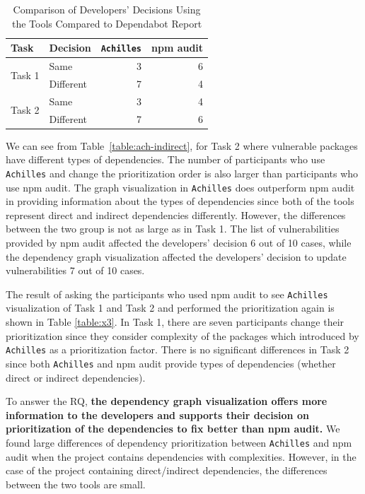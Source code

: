 \documentclass[conference]{IEEEtran}
\begin{document}
	
	\begin{table}[tb]
		\centering
		\caption{Comparison of Developers' Decisions Using the Tools Compared to Dependabot Report}
		\begin{tabular}{llrr}
			\toprule
			Task & Decision & \texttt{Achilles} & npm audit \\
			\midrule
			\multirow{2}{*}{Task 1} & Same & 3 & 6 \\ 
			& Different & 7 & 4 \\ \midrule
			\multirow{2}{*}{Task 2} & Same & 3 & 4 \\ 
			& Different & 7 & 6 \\
			\bottomrule
		\end{tabular}
		\label{table:compare-ach}
	\end{table}
	
	We can see from Table~\ref{table:ach-indirect}, for Task 2 where vulnerable packages have different types of dependencies. The number of participants who use \texttt{Achilles} and change the prioritization order is also larger than participants who use npm audit. The graph visualization in \texttt{Achilles} does outperform npm audit in providing information about the types of dependencies since both of the tools represent direct and indirect dependencies differently. However, the differences between the two group is not as large as in Task 1. The list of vulnerabilities provided by npm audit affected the developers' decision 6 out of 10 cases, while the dependency graph visualization affected the developers' decision to update vulnerabilities 7 out of 10 cases.
	
	The result of asking the participants who used npm audit to see \texttt{Achilles} visualization of Task 1 and Task 2 and performed the prioritization again is shown in Table \ref{table:x3}. In Task 1, there are seven participants change their prioritization since they consider complexity of the packages which introduced by \texttt{Achilles} as a prioritization factor. There is no significant differences in Task 2 since both \texttt{Achilles} and npm audit provide types of dependencies (whether direct or indirect dependencies).
	
	To answer the RQ, \textbf{the dependency graph visualization offers more information to the developers and supports their decision on prioritization of the dependencies to fix better than npm audit.} We found large differences of dependency prioritization between \texttt{Achilles} and npm audit when the project contains dependencies with complexities. However, in the case of the project containing direct/indirect dependencies, the differences between the two tools are small.
	
\end{document}
